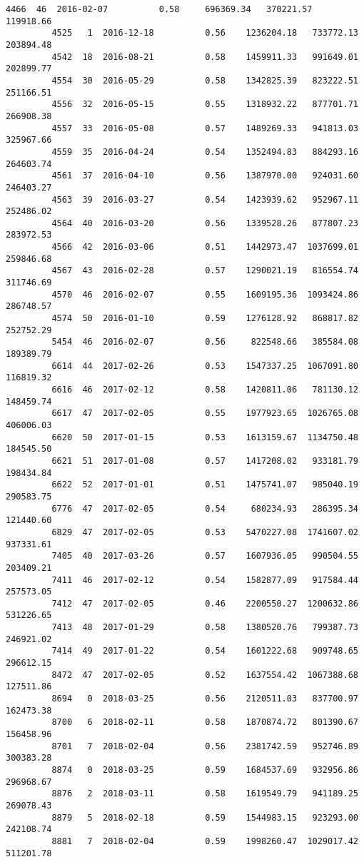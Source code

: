 \documentclass[11pt]{article}
\begin{document}
\begin{Verbatim}[commandchars=\\\{\}]
         4466  46  2016-02-07          0.58     696369.34   370221.57   119918.66   
         4525   1  2016-12-18          0.56    1236204.18   733772.13   203894.48   
         4542  18  2016-08-21          0.58    1459911.33   991649.01   202899.77   
         4554  30  2016-05-29          0.58    1342825.39   823222.51   251166.51   
         4556  32  2016-05-15          0.55    1318932.22   877701.71   266908.38   
         4557  33  2016-05-08          0.57    1489269.33   941813.03   325967.66   
         4559  35  2016-04-24          0.54    1352494.83   884293.16   264603.74   
         4561  37  2016-04-10          0.56    1387970.00   924031.60   246403.27   
         4563  39  2016-03-27          0.54    1423939.62   952967.11   252486.02   
         4564  40  2016-03-20          0.56    1339528.26   877807.23   283972.53   
         4566  42  2016-03-06          0.51    1442973.47  1037699.01   259846.68   
         4567  43  2016-02-28          0.57    1290021.19   816554.74   311746.69   
         4570  46  2016-02-07          0.55    1609195.36  1093424.86   286748.57   
         4574  50  2016-01-10          0.59    1276128.92   868817.82   252752.29   
         5454  46  2016-02-07          0.56     822548.66   385584.08   189389.79   
         6614  44  2017-02-26          0.53    1547337.25  1067091.80   116819.32   
         6616  46  2017-02-12          0.58    1420811.06   781130.12   148459.74   
         6617  47  2017-02-05          0.55    1977923.65  1026765.08   406006.03   
         6620  50  2017-01-15          0.53    1613159.67  1134750.48   184545.50   
         6621  51  2017-01-08          0.57    1417208.02   933181.79   198434.84   
         6622  52  2017-01-01          0.51    1475741.07   985040.19   290583.75   
         6776  47  2017-02-05          0.54     680234.93   286395.34   121440.60   
         6829  47  2017-02-05          0.53    5470227.08  1741607.02   937331.61   
         7405  40  2017-03-26          0.57    1607936.05   990504.55   203409.21   
         7411  46  2017-02-12          0.54    1582877.09   917584.44   257573.05   
         7412  47  2017-02-05          0.46    2200550.27  1200632.86   531226.65   
         7413  48  2017-01-29          0.58    1380520.76   799387.73   246921.02   
         7414  49  2017-01-22          0.54    1601222.68   909748.65   296612.15   
         8472  47  2017-02-05          0.52    1637554.42  1067388.68   127511.86   
         8694   0  2018-03-25          0.56    2120511.03   837700.97   162473.38   
         8700   6  2018-02-11          0.58    1870874.72   801390.67   156458.96   
         8701   7  2018-02-04          0.56    2381742.59   952746.89   300383.28   
         8874   0  2018-03-25          0.59    1684537.69   932956.86   296968.67   
         8876   2  2018-03-11          0.58    1619549.79   941189.25   269078.43   
         8879   5  2018-02-18          0.59    1544983.15   923293.00   242108.74   
         8881   7  2018-02-04          0.59    1998260.47  1029017.42   511201.78   
         

\end{Verbatim}
\end{document}
